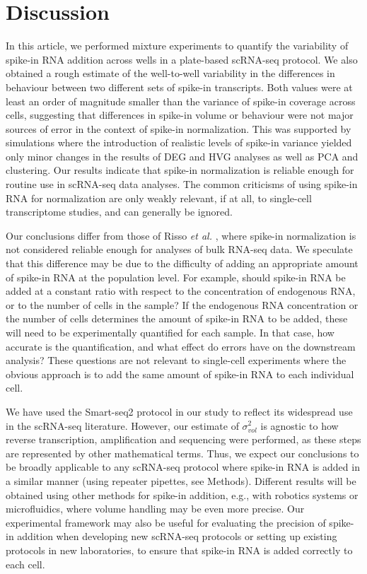 \documentclass{article}
\begin{document}
\section{Discussion}
In this article, we performed mixture experiments to quantify the variability of spike-in RNA addition across wells in a plate-based scRNA-seq protocol.
We also obtained a rough estimate of the well-to-well variability in the differences in behaviour between two different sets of spike-in transcripts.
Both values were at least an order of magnitude smaller than the variance of spike-in coverage across cells, suggesting that differences in spike-in volume or behaviour were not major sources of error in the context of spike-in normalization.
This was supported by simulations where the introduction of realistic levels of spike-in variance yielded only minor changes in the results of DEG and HVG analyses as well as PCA and clustering.
Our results indicate that spike-in normalization is reliable enough for routine use in scRNA-seq data analyses.
The common criticisms of using spike-in RNA for normalization are only weakly relevant, if at all, to single-cell transcriptome studies, and can generally be ignored.

Our conclusions differ from those of Risso \textit{et al.} \cite{risso2014normalization}, where spike-in normalization is not considered reliable enough for analyses of bulk RNA-seq data.
We speculate that this difference may be due to the difficulty of adding an appropriate amount of spike-in RNA at the population level.
For example, should spike-in RNA be added at a constant ratio with respect to the concentration of endogenous RNA, or to the number of cells in the sample?
If the endogenous RNA concentration or the number of cells determines the amount of spike-in RNA to be added, these will need to be experimentally quantified for each sample.
In that case, how accurate is the quantification, and what effect do errors have on the downstream analysis?
These questions are not relevant to single-cell experiments where the obvious approach is to add the same amount of spike-in RNA to each individual cell.

We have used the Smart-seq2 protocol in our study to reflect its widespread use in the scRNA-seq literature.
However, our estimate of $\sigma^2_{vol}$ is agnostic to how reverse transcription, amplification and sequencing were performed, as these steps are represented by other mathematical terms.
Thus, we expect our conclusions to be broadly applicable to any scRNA-seq protocol where spike-in RNA is added in a similar manner (using repeater pipettes, see Methods).
Different results will be obtained using other methods for spike-in addition, e.g., with robotics systems or microfluidics, where volume handling may be even more precise.
Our experimental framework may also be useful for evaluating the precision of spike-in addition when developing new scRNA-seq protocols or setting up existing protocols in new laboratories, to ensure that spike-in RNA is added correctly to each cell.
\end{document}

